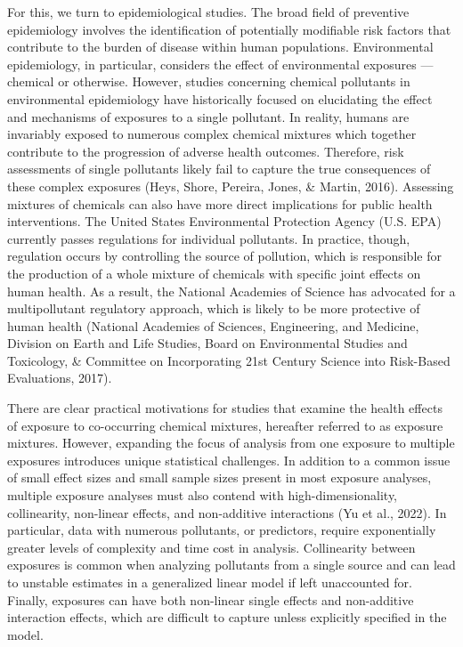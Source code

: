 \documentclass[12pt, twoside]{amherstthesis}
\begin{document}
For this, we turn to epidemiological studies. The broad field of preventive epidemiology involves the identification of potentially modifiable risk factors that contribute to the burden of disease within human populations. Environmental epidemiology, in particular, considers the effect of environmental exposures --- chemical or otherwise. However, studies concerning chemical pollutants in environmental epidemiology have historically focused on elucidating the effect and mechanisms of exposures to a single pollutant. In reality, humans are invariably exposed to numerous complex chemical mixtures which together contribute to the progression of adverse health outcomes. Therefore, risk assessments of single pollutants likely fail to capture the true consequences of these complex exposures (Heys, Shore, Pereira, Jones, \& Martin, 2016). Assessing mixtures of chemicals can also have more direct implications for public health interventions. The United States Environmental Protection Agency (U.S. EPA) currently passes regulations for individual pollutants. In practice, though, regulation occurs by controlling the source of pollution, which is responsible for the production of a whole mixture of chemicals with specific joint effects on human health. As a result, the National Academies of Science has advocated for a multipollutant regulatory approach, which is likely to be more protective of human health (National Academies of Sciences, Engineering, and Medicine, Division on Earth and Life Studies, Board on Environmental Studies and Toxicology, \& Committee on Incorporating 21st Century Science into Risk-Based Evaluations, 2017).

There are clear practical motivations for studies that examine the health effects of exposure to co-occurring chemical mixtures, hereafter referred to as exposure mixtures. However, expanding the focus of analysis from one exposure to multiple exposures introduces unique statistical challenges. In addition to a common issue of small effect sizes and small sample sizes present in most exposure analyses, multiple exposure analyses must also contend with high-dimensionality, collinearity, non-linear effects, and non-additive interactions (Yu et al., 2022). In particular, data with numerous pollutants, or predictors, require exponentially greater levels of complexity and time cost in analysis. Collinearity between exposures is common when analyzing pollutants from a single source and can lead to unstable estimates in a generalized linear model if left unaccounted for. Finally, exposures can have both non-linear single effects and non-additive interaction effects, which are difficult to capture unless explicitly specified in the model.
\end{document}
